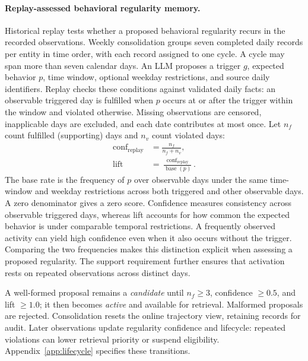 \paragraph{Replay-assessed behavioral regularity memory.}
Historical replay tests whether a proposed behavioral regularity recurs in the recorded observations.
Weekly consolidation groups seven completed daily records per entity in time order, with each record assigned to one cycle.
A cycle may span more than seven calendar days.
An LLM proposes a trigger $g$, expected behavior $p$, time window, optional weekday restrictions, and source daily identifiers.
Replay checks these conditions against validated daily facts: an observable triggered day is fulfilled when $p$ occurs at or after the trigger within the window and violated otherwise.
Missing observations are censored, inapplicable days are excluded, and each date contributes at most once.
Let $n_f$ count fulfilled (supporting) days and $n_v$ count violated days:
\begin{equation}
\begin{aligned}
\operatorname{conf}_{\mathrm{replay}}&=\frac{n_f}{n_f+n_v},\\
\operatorname{lift}&=\frac{\operatorname{conf}_{\mathrm{replay}}}{\operatorname{base}(p)}.
\end{aligned}
\label{eq:replay_gate}
\end{equation}
The base rate is the frequency of $p$ over observable days under the same time-window and weekday restrictions across both triggered and other observable days.
A zero denominator gives a zero score.
Confidence measures consistency across observable triggered days, whereas lift accounts for how common the expected behavior is under comparable temporal restrictions.
A frequently observed activity can yield high confidence even when it also occurs without the trigger.
Comparing the two frequencies makes this distinction explicit when assessing a proposed regularity.
The support requirement further ensures that activation rests on repeated observations across distinct days.

A well-formed proposal remains a \emph{candidate} until $n_f\geq3$, confidence $\geq0.5$, and lift $\geq1.0$; it then becomes \emph{active} and available for retrieval.
Malformed proposals are rejected.
Consolidation resets the online trajectory view, retaining records for audit.
Later observations update regularity confidence and lifecycle: repeated violations can lower retrieval priority or suspend eligibility.
Appendix~\ref{app:lifecycle} specifies these transitions.

